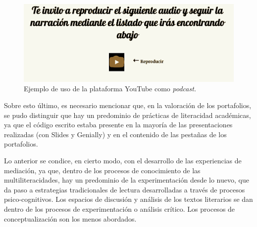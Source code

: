 \begin{figure}[htpb]
\centering
\begin{minipage}{\textwidth}
\caption{Ejemplo de uso de la plataforma YouTube como \emph{podcast.}}
\label{fig-05}
\includegraphics[width=\textwidth]{fig5}
\end{minipage}
\end{figure}

Sobre esto último, es necesario mencionar que, en la valoración de los
portafolios, se pudo distinguir que hay un predominio de prácticas de
literacidad académicas, ya que el código escrito estaba presente en la
mayoría de las presentaciones realizadas (con Slides y Genially) y en el
contenido de las pestañas de los portafolios.

Lo anterior se condice, en cierto modo, con el desarrollo de las
experiencias de mediación, ya que, dentro de los procesos de
conocimiento de las multiliteracidades, hay un predominio de la
experimentación desde lo nuevo, que da paso a estrategias tradicionales
de lectura desarrolladas a través de procesos psico-cognitivos. Los
espacios de discusión y análisis de los textos literarios se dan dentro
de los procesos de experimentación o análisis crítico. Los procesos de
conceptualización son los menos abordados.
